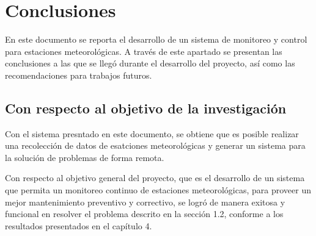 \chapter{Conclusiones}\label{conclusiones}

En este documento se reporta el desarrollo de un sistema de monitoreo y control para estaciones meteorológicas. A través de este apartado se presentan las conclusiones a las que se llegó durante el desarrollo del proyecto, así como las recomendaciones para trabajos futuros.


\section{Con respecto al objetivo de la investigación}



Con el sistema presntado en este documento, se obtiene que es posible realizar una recolección de datos de esatciones meteorológicas y generar un sistema para la solución de problemas de forma remota. %

Con respecto al objetivo general del proyecto, que es el desarrollo de un sistema que permita un monitoreo continuo de estaciones meteorológicas, para proveer un mejor mantenimiento preventivo y correctivo, se logró de manera exitosa y funcional en resolver el problema descrito en la sección 1.2, conforme a los resultados presentados en el capítulo 4.


